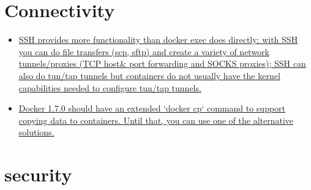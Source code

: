 \section{Connectivity}
\begin{itemize}

\item \href{%
https://developer.ibm.com/bluemix/2015/11/18/docker-workaround-lack-of-network-connectivity-between-client-and-container/
}{%
SSH provides more functionality than docker exec does directly: with SSH you can do file transfers (scp, sftp) and create a variety of network tunnels/proxies (TCP host\& port forwarding and SOCKS proxies); SSH can also do tun/tap tunnels but containers do not usually have the kernel capabilities needed to configure tun/tap tunnels.}

\item \href{%
https://medium.com/@gchudnov/copying-data-between-docker-containers-26890935da3f#.1qil6fc2j
}{%
Docker 1.7.0 should have an extended `docker cp` command to support copying data to containers. Until that, you can use one of the alternative solutions.
}
\end{itemize}


\section{security}


%

